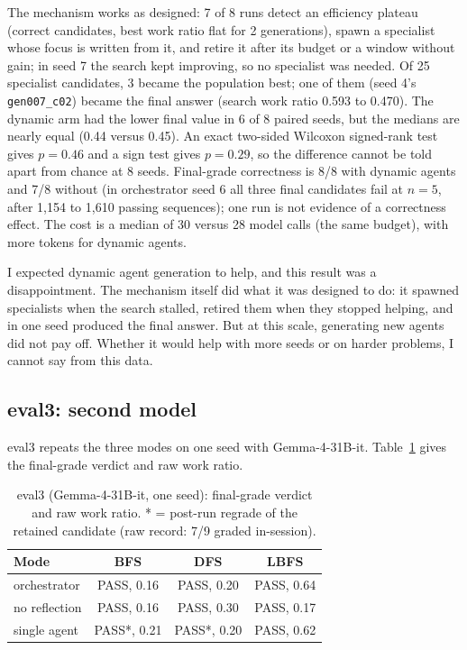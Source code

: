 The mechanism works as designed: 7 of 8 runs detect an efficiency plateau
(correct candidates, best work ratio flat for 2 generations), spawn a
specialist whose focus is written from it, and retire it after its budget or a
window without gain; in seed 7 the search kept improving, so no specialist was
needed. Of 25 specialist candidates, 3 became the population best; one of them
(seed 4's \texttt{gen007\_c02}) became the final answer (search work ratio 0.593
to 0.470). The dynamic arm had the lower final value in 6 of 8 paired seeds,
but the medians are nearly equal (0.44 versus 0.45). An exact two-sided Wilcoxon
signed-rank test \citep{wilcoxon1945} gives $p = 0.46$ and a sign test gives
$p = 0.29$, so the difference cannot be told apart from chance at 8 seeds. Final-grade
correctness is 8/8 with dynamic agents and 7/8 without (in orchestrator seed 6
all three final candidates fail at $n = 5$, after 1{,}154 to 1{,}610 passing
sequences); one run is not
evidence of a correctness effect. The cost is a median of 30 versus 28 model
calls (the same budget), with more tokens for dynamic agents.

I expected dynamic agent generation to help, and this result was a
disappointment. The mechanism itself did what it was designed to do: it spawned
specialists when the search stalled, retired them when they stopped helping, and
in one seed produced the final answer. But at this scale, generating new agents
did not pay off. Whether it would help with more seeds or on harder problems, I
cannot say from this data.

\subsection{eval3: second model}

eval3 repeats the three modes on one seed with Gemma-4-31B-it.
Table~\ref{tab:eval3} gives the final-grade verdict and raw work ratio.

\begin{table}[H]
\centering
\footnotesize
\caption{eval3 (Gemma-4-31B-it, one seed): final-grade verdict and raw work
ratio. * = post-run regrade of the retained candidate (raw record: 7/9 graded
in-session).}
\label{tab:eval3}
\begin{tabular}{@{}lccc@{}}
\toprule
Mode & BFS & DFS & LBFS \\
\midrule
orchestrator & PASS, 0.16 & PASS, 0.20 & PASS, 0.64 \\
no reflection & PASS, 0.16 & PASS, 0.30 & PASS, 0.17 \\
single agent & PASS*, 0.21 & PASS*, 0.20 & PASS, 0.62 \\
\bottomrule
\end{tabular}
\end{table}

